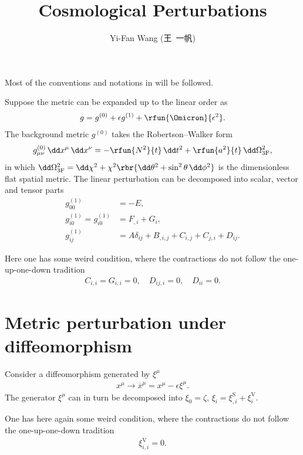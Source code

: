 \documentclass[a4paper,11pt]{article}
\title{Cosmological Perturbations}
\author{Yi-Fan Wang (王\ 一帆)}
\begin{document}
\maketitle

Most of the conventions and notations in \cite[ch.~5]{Weinberg2008} will be 
followed.

Suppose the metric can be expanded up to the linear 
order as
\begin{align}
g = g^{(0)} + \epsilon g^{(1)} + \rfun{\Omicron}{\epsilon^2}.
\end{align}
The background metric $g^{(0)}$ takes the Robertson--Walker form
\begin{align}
g^{(0)}_{\mu\nu}\,\dd x^\mu\,\dd x^\nu =
-\rfun{N^2}{t}\,\dd t^2 + \rfun{a^2}{t}\,\dd \Omega_\text{3F}^2,
\end{align}
in which $\dd\Omega_\text{3F}^2 =
\dd\chi^2 + \chi^2\rbr{\dd\theta^2 + \sin^2\theta\,\dd \phi^2}$ is the 
dimensionless flat spatial metric.
The linear perturbation can be decomposed into scalar, vector and 
tensor parts
\begin{align}
g^{(1)}_{00} &= -E, \\
g^{(1)}_{i0} = g^{(1)}_{i0} &= F_{,i}+G_i, \\
g^{(1)}_{ij} &= A \delta_{ij} + B_{,i,j}+C_{i,j}+C_{j,i}+D_{ij}.
\end{align}

Here one has some weird condition, where the contractions do not follow the 
one-up-one-down tradition
\begin{align}
C_{i,i} = G_{i,i} = 0,
\quad
D_{ij,i} = 0,
\quad
D_{ii} = 0.
\end{align}

\section{Metric perturbation under diffeomorphism}


Consider a diffeomorphism generated by $\xi^\mu$
\begin{align}
x^\mu \to \overline{x}^\mu = x^\mu - \epsilon \xi^\mu.
\end{align}
The generator $\xi^\mu$ can in turn be decomposed into $\xi_0 = \zeta$, 
$\xi_i 
= \xi^\text{S}_{,i} + \xi^\text{V}_{i}$.

One has here again some weird condition, where the contractions do not follow 
the one-up-one-down tradition
\begin{align}
\xi^\text{V}_{i,i} = 0.
\end{align}
\end{document}
